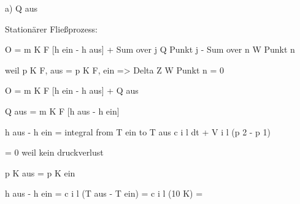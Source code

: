 a) Q aus

Stationärer Fließprozess:

O = m K F [h ein - h aus] + Sum over j Q Punkt j - Sum over n W Punkt n

weil p K F, aus = p K F, ein => Delta Z W Punkt n = 0

O = m K F [h ein - h aus] + Q aus

Q aus = m K F [h aus - h ein]

h aus - h ein = integral from T ein to T aus c i l dt + V i l (p 2 - p 1)

= 0 weil kein druckverlust

p K aus = p K ein

h aus - h ein = c i l (T aus - T ein) = c i l (10 K) =